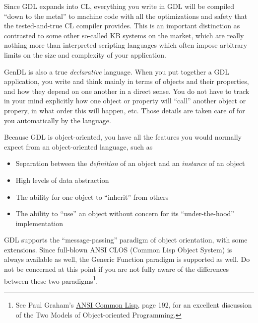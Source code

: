 \documentclass [11pt]{book}
\begin{document}
Since GDL expands into CL, everything you write in GDL will be
compiled ``down to the metal'' to machine code with all the
optimizations and safety that the tested-and-true CL compiler
provides. This is an important distinction as contrasted to some other
so-called KB systems on the market, which are really nothing more than
interpreted scripting languages which often impose arbitrary limits on
the size and complexity of your application.

GenDL is also a true \emph{declarative} language. When you put together a GDL application, you write and think mainly
in terms of objects and their properties, and how they depend on one another in a direct
sense. You do not have to track in your mind explicitly how one object or property will ``call''
another object or propery, in what order this will happen, etc. Those details are
taken care of for you automatically by the language. 

Because GDL is object-oriented, you have all the features you would normally expect
from an object-oriented language, such as 

\begin{itemize}

\item Separation between the \emph{definition} of an object and an \emph{instance} of an object

\item High levels of data abstraction

\item The ability for one object to ``inherit'' from others

\item The ability to ``use'' an object without concern for its ``under-the-hood'' implementation

\end{itemize}

GDL supports the ``message-passing'' paradigm of object orientation, with some extensions. Since
full-blown ANSI CLOS (Common Lisp Object System) is always available as well, the Generic Function paradigm 
is supported as well. Do not be concerned at this point if you are not fully aware of the differences 
between these two paradigms\footnote{See Paul Graham's 
\underline{ANSI Common Lisp}, page 192, for an excellent discussion of the Two Models 
of Object-oriented Programming.}.
\end{document}
